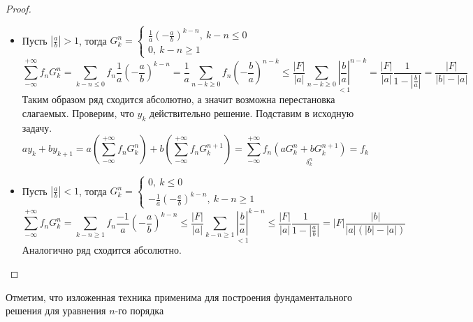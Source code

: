 \begin{proof}
  \begin{itemize}
    \item Пусть $\left|\frac{a}{b}\right|>1$, тогда $G_k^n=\begin{cases}
              \frac{1}{a}\left(-\frac{a}{b}\right)^{k-n},\ k-n\leq 0 \\
              0,\ k-n\geq1
            \end{cases}$
          \[\sum_{-\infty}^{+\infty}f_nG_k^n=\sum_{k-n\leq0}f_n\frac{1}{a}\left(-\frac{a}{b}\right)^{k-n}=\frac{1}{a}\sum_{n-k\geq0}f_n\left(-\frac{b}{a}\right)^{n-k}\leq\frac{|F|}{|a|}\sum_{n-k\geq0}\underset{<1}{\left|\frac{b}{a}\right|}^{n-k}=\frac{|F|}{|a|}\frac{1}{1-\left|\frac{b}{a}\right|}=\frac{|F|}{|b|-|a|}\]
          Таким образом ряд сходится абсолютно, а значит возможна перестановка слагаемых.
          Проверим, что $y_k$ действительно решение. Подставим в исходную задачу.
          \[ay_k+by_{k+1}=a\left(\sum_{-\infty}^{+\infty}f_nG_k^n\right)+b\left(\sum_{-\infty}^{+\infty}f_nG_k^{n+1}\right)=\sum_{-\infty}^{+\infty}f_n\underset{\delta_k^n}{(aG_k^n+bG_k^{n+1})}=f_k\]
    \item Пусть $\left|\frac{a}{b}\right|<1$, тогда $G_k^n=\begin{cases}
              0,\ k\leq 0 \\
              -\frac{1}{a}\left(-\frac{a}{b}\right)^{k-n},\ k-n\geq1
            \end{cases}$
          \[\sum_{-\infty}^{+\infty}f_nG_k^n=\sum_{k-n\geq1}f_n\frac{-1}{a}\left(-\frac{a}{b}\right)^{k-n}\leq\frac{|F|}{|a|}\sum_{k-n\geq1}\underset{<1}{\left|\frac{b}{a}\right|}^{k-n}\leq\frac{|F|}{|a|}\frac{1}{1-\left|\frac{a}{b}\right|}=|F|\frac{|b|}{|a|(|b|-|a|)}\]
          Аналогично ряд сходится абсолютно.
  \end{itemize}
\end{proof}

Отметим, что изложенная техника применима для построения фундаментального решения для уравнения
$n$-го порядка
